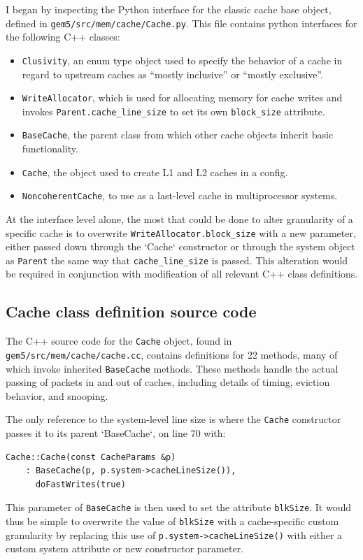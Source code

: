 \documentclass[12pt,twoside]{reedthesis}
\begin{document}
	I began by inspecting the Python interface for the classic cache base object, defined in \verb`gem5/src/mem/cache/Cache.py`. This file contains python interfaces for the following C++ classes:
	\begin{itemize}
		\item \verb`Clusivity`, an enum type object used to specify the behavior of a cache in regard to upstream caches as ``mostly inclusive'' or ``mostly exclusive''.
		\item \verb`WriteAllocator`, which is used for allocating memory for cache writes and invokes \verb`Parent.cache_line_size` to set its own \verb`block_size` attribute.
		\item \verb`BaseCache`, the parent class from which other cache objects inherit basic functionality.
		\item \verb`Cache`, the object used to create L1 and L2 caches in a config.
		\item \verb`NoncoherentCache`, to use as a last-level cache in multiprocessor systems.
	\end{itemize}

	At the interface level alone, the most that could be done to alter granularity of a specific cache is to overwrite \verb`WriteAllocator.block_size` with a new parameter, either passed down through the `Cache` constructor or through the system object as \verb`Parent` the same way that \verb`cache_line_size` is passed. This alteration would be required in conjunction with modification of all relevant C++ class definitions.

	\subsection*{Cache class definition source code}

	The C++ source code for the \verb`Cache` object, found in \verb`gem5/src/mem/cache/cache.cc`, contains definitions for 22 methods, many of which invoke inherited \verb`BaseCache` methods. These methods handle the actual passing of packets in and out of caches, including details of timing, eviction behavior, and snooping.

	The only reference to the system-level line size is where the \verb`Cache` constructor passes it to its parent `BaseCache`, on line 70 with:
	\begin{verbatim}
Cache::Cache(const CacheParams &p)
    : BaseCache(p, p.system->cacheLineSize()),
      doFastWrites(true)
	\end{verbatim}
	This parameter of \verb`BaseCache` is then used to set the attribute \verb`blkSize`. It would thus be simple to overwrite the value of \verb`blkSize` with a cache-specific custom granularity by replacing this use of \verb`p.system->cacheLineSize()` with either a custom system attribute or new constructor parameter.
\end{document}
